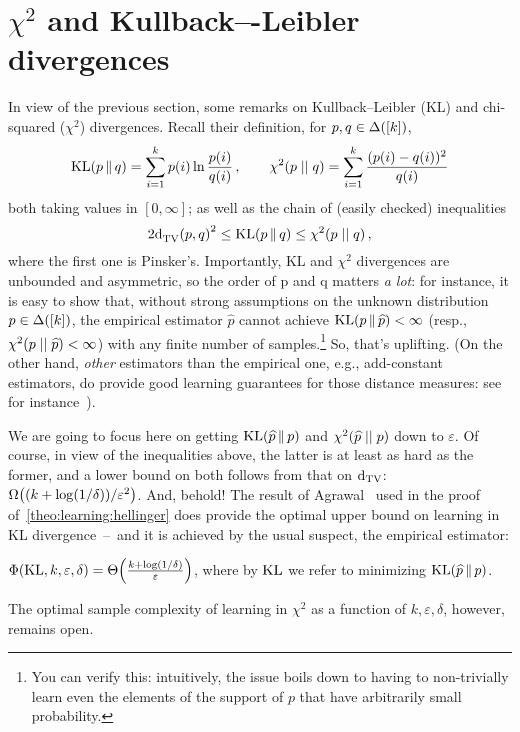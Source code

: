 \documentclass[10pt]{article}
\newcommand{\dst}{\varepsilon}
\newcommand{\ab}{k}
\begin{document}
\section{$\chi^2$ and Kullback–-Leibler divergences}
In view of the previous section, some remarks on Kullback--Leibler (KL) and chi-squared ($\chi^2$) divergences. Recall their definition, for $p,q\in\distribs{[\ab]}$,
\[
    \kldiv{p}{q} = \sum_{i=1}^\ab p(i) \ln \frac{p(i)}{q(i)}\,,\qquad \chisquare{p}{q} = \sum_{i=1}^\ab \frac{(p(i)-q(i))^2}{q(i)}
\]
both taking values in $[0,\infty]$; as well as the chain of (easily checked) inequalities
\[
    2\totalvardist{p}{q}^2 \leq \kldiv{p}{q} %
    \leq \chisquare{p}{q}\,,
\]
where the first one is Pinsker's. Importantly, KL and $\chi^2$ divergences are unbounded and asymmetric, so
the order of p and q matters \emph{a lot}: for instance, it is easy to show that, without strong assumptions on the
unknown distribution $p\in\distribs{[\ab]}$, the empirical estimator $\widehat{p}$ cannot achieve $\kldiv{p}{\widehat{p}} < \infty$ (resp., $\chisquare{p}{\widehat{p}} < \infty$) with any finite number of samples.\footnote{You can verify this: intuitively, the issue boils down to having to non-trivially learn even the elements of the support of $p$ that have arbitrarily small probability.}{} So, that's uplifting. (On the other hand, \emph{other} estimators than the empirical one, e.g., add-constant estimators, do provide good learning guarantees for those distance measures: see for instance~\cite{Kamath:15}).\smallskip

We are going to focus here on getting $\kldiv{\widehat{p}}{p}$ and $\chisquare{\widehat{p}}{p}$ down to $\dst$. Of course, in view of the inequalities above, the latter is at least as hard as the former, and a lower bound on both follows from that on $\operatorname{d}_{\rm TV}$: $\bigOmega{(\ab+\log(1/\delta))/\dst^2}$. And, behold! The result of Agrawal~\cite{Agrawal:19} used in the proof of~\autoref{theo:learning:hellinger} does provide the optimal upper bound on learning in KL divergence~--~and it is achieved by the usual suspect, the empirical estimator:
\begin{theorem}\label{theo:learning:kl}
  $\Phi(\kl,\ab,\dst,\delta) = \bigTheta{\frac{\ab+\log(1/\delta)}{\dst}}$, where by $\operatorname{KL}$ we refer to minimizing $\kldiv{\widehat{p}}{p}$.
\end{theorem}
\noindent The optimal sample complexity of learning in $\chi^2$ as a function of $\ab,\dst,\delta$, however, remains open.
\end{document}
